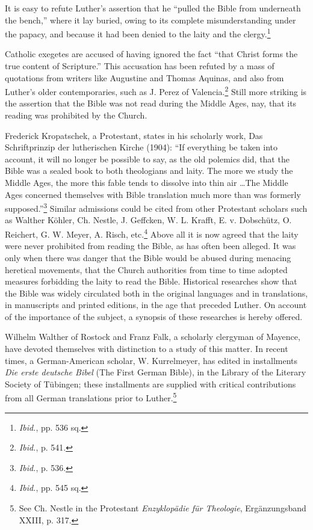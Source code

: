 It is easy to refute Luther’s assertion that he “pulled the Bible from
underneath the bench,” where it lay buried, owing to its complete
misunderstanding under the papacy, and because it had been denied
to the laity and the clergy.\footnote{\textit{Ibid.}, pp. 536 sq.}

Catholic exegetes are accused of having ignored the fact “that
Christ forms the true content of Scripture.” This accusation has been
refuted by a mass of quotations from writers like Augustine and
Thomas Aquinas, and also from Luther’s older contemporaries, such
as J. Perez of Valencia.\footnote{\textit{Ibid.}, p. 541.}
 Still more striking is the assertion that the
Bible was not read during the Middle Ages, nay, that its reading was
prohibited by the Church.

Frederick Kropatschek, a Protestant, states in his scholarly work,
Das Schriftprinzip der lutherischen Kirche (1904): “If everything
be taken into account, it will no longer be possible to say, as the old
polemics did, that the Bible was a sealed book to both theologians and
laity. The more we study the Middle Ages, the more this fable tends
to dissolve into thin air \dots The Middle Ages concerned themselves
with Bible translation much more than was formerly supposed.”\footnote{\textit{Ibid.}, p. 536.}
Similar admissions could be cited from other Protestant scholars
such as Walther Köhler, Ch. Nestle, J. Geffcken, W. L. Krafft, E.
v. Dobschütz, O. Reichert, G. W. Meyer, A. Risch, etc.\footnote{\textit{Ibid.}, pp. 545 sq.}
Above all
it is now agreed that the laity were never prohibited from reading the
Bible, as has often been alleged. It was only when there was danger
that the Bible would be abused during menacing heretical movements,
that the Church authorities from time to time adopted measures forbidding
the laity to read the Bible. Historical researches show that the
Bible was widely circulated both in the original languages and in translations,
in manuscripts and printed editions, in the age that preceded
Luther. On account of the importance of the subject, a synopsis of
these researches is hereby offered.

Wilhelm Walther of Rostock and Franz Falk, a scholarly clergyman of
Mayence, have devoted themselves with distinction to a study of this matter.
In recent times, a German-American scholar, W. Kurrelmeyer, has edited
in installments \textit{Die erste deutsche Bibel} (The First German Bible), in the
Library of the Literary Society of Tübingen; these installments are supplied
with critical contributions from all German translations prior to Luther.\footnote
{See Ch. Nestle in the Protestant \textit{Enzyklopädie für Theologie}, Ergänzungsband XXIII,
p. 317.}

